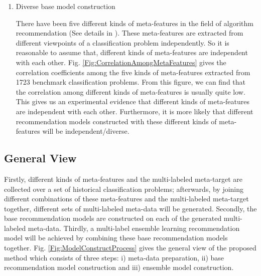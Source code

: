 \documentclass[acmsmall]{acmart}
\begin{document}
\begin{enumerate}
	 \item Diverse base model construction
	
	There have been five different kinds of meta-features in the
	field of algorithm recommendation (See details in \cite{wang2014generic}). These meta-features are extracted
	from different viewpoints of a classification problem independently. So it is
	reasonable to assume that, different kinds of meta-features are independent
	with each other. Fig. \ref{Fig:CorrelationAmongMetaFeatures} gives the correlation
	coefficients among the five kinds of meta-features extracted from
	1723 benchmark classification problems. From this figure, we can
	find that the correlation among different kinds of meta-features is
	usually quite low. This gives us an experimental evidence that different kinds of
	meta-features are independent with each other.
	Furthermore, it is more likely that different recommendation models constructed with
	these different kinds of meta-features will be independent/diverse.
\end{enumerate}
\subsection{General View}\label{subsec:genView}

Firstly, different kinds of meta-features and the multi-labeled
meta-target are collected over a set of historical classification
problems; afterwards, by joining different combinations of these
meta-features and the multi-labeled meta-target together, different
sets of multi-labeled meta-data will be generated. Secondly, the
base recommendation models are constructed on each of the generated
multi-labeled meta-data. Thirdly, a multi-label ensemble learning
recommendation model will be achieved by combining these base
recommendation models together. Fig. \ref{Fig:ModelConstructProcess}
gives the general view of the proposed method which consists of
three steps: i) meta-data preparation, ii) base recommendation model
construction and iii) ensemble model construction.
\end{document}
